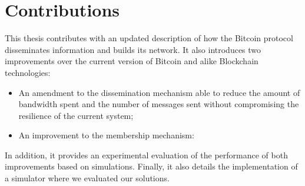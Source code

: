 \section{Contributions}
\label{chap:contributions}

This thesis contributes with an updated description of how the Bitcoin protocol disseminates information and builds its network. It also introduces  two improvements over the current version of Bitcoin and alike Blockchain technologies:
\begin{itemize}
\item An amendment to the dissemination mechanism able to reduce the amount of bandwidth spent and the number of messages sent without compromising the resilience of the current system;
\item An improvement to the membership mechanism:
\end{itemize}
In addition, it provides an experimental evaluation of the performance of both improvements based on simulations.
Finally, it also details the implementation of a simulator where we evaluated our solutions.




